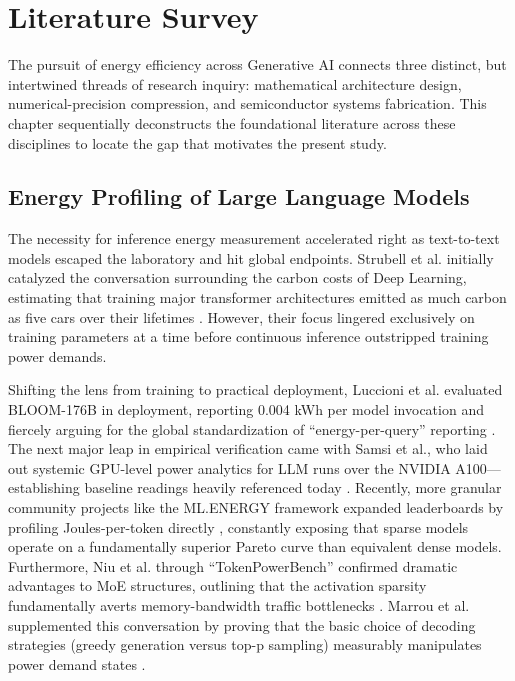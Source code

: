 \documentclass[12pt, a4paper]{report}
\begin{document}
\chapter{Literature Survey}
\label{ch:lit_survey}

The pursuit of energy efficiency across Generative AI connects three distinct, but intertwined threads of research inquiry: mathematical architecture design, numerical-precision compression, and semiconductor systems fabrication. This chapter sequentially deconstructs the foundational literature across these disciplines to locate the gap that motivates the present study.

\section{Energy Profiling of Large Language Models}
The necessity for inference energy measurement accelerated right as text-to-text models escaped the laboratory and hit global endpoints. Strubell et al. initially catalyzed the conversation surrounding the carbon costs of Deep Learning, estimating that training major transformer architectures emitted as much carbon as five cars over their lifetimes \cite{strubell2019energy}. However, their focus lingered exclusively on training parameters at a time before continuous inference outstripped training power demands.

Shifting the lens from training to practical deployment, Luccioni et al. evaluated BLOOM-176B in deployment, reporting 0.004 kWh per model invocation and fiercely arguing for the global standardization of ``energy-per-query'' reporting \cite{luccioni2023power}. The next major leap in empirical verification came with Samsi et al., who laid out systemic GPU-level power analytics for LLM runs over the NVIDIA A100—establishing baseline readings heavily referenced today \cite{samsi2023words}. Recently, more granular community projects like the ML.ENERGY framework expanded leaderboards by profiling Joules-per-token directly \cite{mlenergy2025}, constantly exposing that sparse models operate on a fundamentally superior Pareto curve than equivalent dense models. Furthermore, Niu et al. through ``TokenPowerBench'' confirmed dramatic advantages to MoE structures, outlining that the activation sparsity fundamentally averts memory-bandwidth traffic bottlenecks \cite{niu2025tokenpowerbench}. Marrou et al. supplemented this conversation by proving that the basic choice of decoding strategies (greedy generation versus top-p sampling) measurably manipulates power demand states \cite{marrou2025decoding}.
\end{document}
